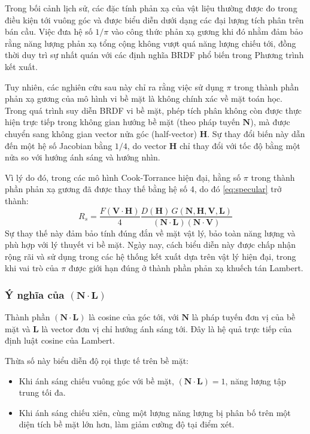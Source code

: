 Trong bối cảnh lịch sử, các đặc tính phản xạ của vật liệu thường được đo trong điều kiện tới vuông góc và được biểu diễn dưới dạng các đại lượng tích phân trên bán cầu. Việc đưa hệ số $1/\pi$ vào công thức phản xạ gương khi đó nhằm đảm bảo rằng năng lượng phản xạ tổng cộng không vượt quá năng lượng chiếu tới, đồng thời duy trì sự nhất quán với các định nghĩa BRDF phổ biến trong Phương trình kết xuất.

Tuy nhiên, các nghiên cứu sau này chỉ ra rằng việc sử dụng $\pi$ trong thành phần phản xạ gương của mô hình vi bề mặt là không chính xác về mặt toán học. Trong quá trình suy diễn BRDF vi bề mặt, phép tích phân không còn được thực hiện trực tiếp trong không gian hướng bề mặt (theo pháp tuyến $\mathbf{N}$), mà được chuyển sang không gian vector nửa góc (half-vector) $\mathbf{H}$. Sự thay đổi biến này dẫn đến một hệ số Jacobian bằng $1/4$, do vector $\mathbf{H}$ chỉ thay đổi với tốc độ bằng một nửa so với hướng ánh sáng và hướng nhìn.

Vì lý do đó, trong các mô hình Cook-Torrance hiện đại, hằng số $\pi$ trong thành phần phản xạ gương đã được thay thế bằng hệ số 4, do đó \eqref{eq:specular} trở thành:
\begin{equation}
	R_s = \frac{F(\mathbf{V} \cdot \mathbf{H})}{4} \frac{D(\mathbf{H})\,G(\mathbf{N}, \mathbf{H}, \mathbf{V}, \mathbf{L})}{(\mathbf{N} \cdot \mathbf{L})(\mathbf{N} \cdot \mathbf{V})}
\end{equation}
Sự thay thế này đảm bảo tính đúng đắn về mặt vật lý, bảo toàn năng lượng và phù hợp với lý thuyết vi bề mặt. Ngày nay, cách biểu diễn này được chấp nhận rộng rãi và sử dụng trong các hệ thống kết xuất dựa trên vật lý hiện đại, trong khi vai trò của $\pi$ được giới hạn đúng ở thành phần phản xạ khuếch tán Lambert.

\subsubsection{Ý nghĩa của $(\mathbf{N} \cdot \mathbf{L})$}

Thành phần $(\mathbf{N} \cdot \mathbf{L})$ là cosine của góc tới, với $\mathbf{N}$ là pháp tuyến đơn vị của bề mặt và $\mathbf{L}$ là vector đơn vị chỉ hướng ánh sáng tới. Đây là hệ quả trực tiếp của định luật cosine của Lambert.

Thừa số này biểu diễn độ rọi thực tế trên bề mặt:
\begin{itemize}
	\item Khi ánh sáng chiếu vuông góc với bề mặt, $(\mathbf{N} \cdot \mathbf{L}) = 1$, năng lượng tập trung tối đa.
	\item Khi ánh sáng chiếu xiên, cùng một lượng năng lượng bị phân bố trên một diện tích bề mặt lớn hơn, làm giảm cường độ tại điểm xét.
\end{itemize}

